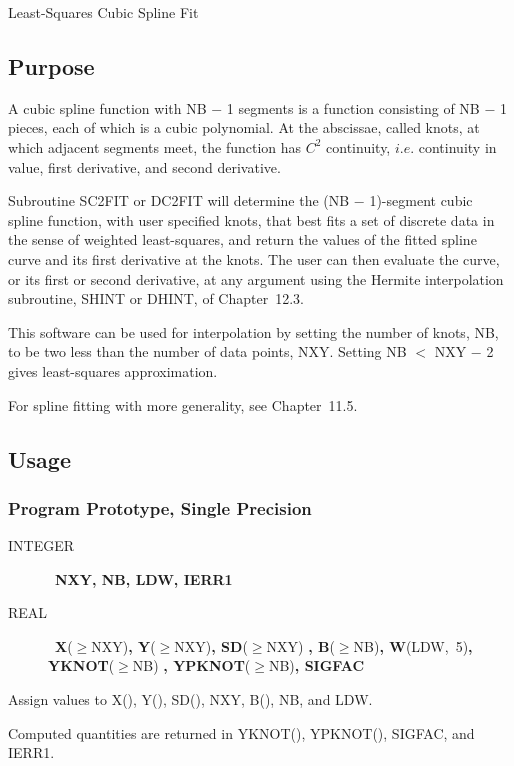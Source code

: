 \documentclass[twoside]{MATH77}
\begin{document}
 Least-Squares Cubic Spline Fit


\subsection{Purpose}

A cubic spline function with NB $-$ 1 segments is a function consisting of
NB $-$ 1 pieces, each of which is a cubic polynomial. At the abscissae,
called knots, at which adjacent segments meet, the function has $C^2$
continuity, $i.e$. continuity in value, first derivative, and second
derivative.

Subroutine SC2FIT or DC2FIT will determine the (NB $-$ 1)-segment cubic spline
function, with user specified knots, that best fits a set of discrete data
in the sense of weighted least-squares, and return the values of the fitted
spline curve and its first derivative at the knots. The user can then
evaluate the curve, or its first or second derivative, at any argument using
the Hermite interpolation subroutine, SHINT or DHINT, of Chapter~12.3.

This software can be used for interpolation by setting the number of knots,
NB, to be two less than the number of data points, NXY. Setting NB $<$
NXY $-$ 2 gives least-squares approximation.

For spline fitting with more generality, see Chapter~11.5.

\subsection{Usage}

\subsubsection{Program Prototype, Single Precision}
\begin{description}
\item[INTEGER]  \ {\bf NXY, NB, LDW, IERR1}

\item[REAL]  \ {\bf X}($\geq $NXY){\bf , Y}($\geq $NXY){\bf , SD}($\geq $NXY)%
{\bf , \nolinebreak B}($\geq $NB){\bf , W}(LDW,~5){\bf , YKNOT}($\geq $NB)%
{\bf , YPKNOT}($\geq $NB){\bf , SIGFAC}
\end{description}
Assign values to X(), Y(), SD(), NXY, B(), NB, and LDW.\vspace{-15pt}
\begin{center}
\end{center}
Computed quantities are returned in YKNOT(), YPKNOT(), SIGFAC, and IERR1.
\end{document}
